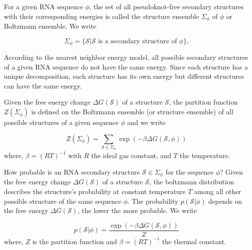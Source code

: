 \begin{mydef}
	\label{def:structure_ensemble}
	For a given \ac{RNA} sequence $\phi$,  the set of all pseudoknot-free secondary structures with their corresponding energies is called the structure ensemble $\Sigma_{\phi}$ of $\phi$ or Boltzmann ensemble.  We write
	
	$$
	\Sigma_{\phi} = \{ \mathcal{S} | \mathcal{S} \text{ is a secondary structure of $\phi$}\}.
	$$
	
	According to the nearest neighbor energy model, all possible secondary structures of a given \ac{RNA} sequence do not have the same energy. Since each structure has a unique decomposition, each structure has its own energy but different structures can have the same energy.
\end{mydef}
\begin{mydef}
	\label{def:partition_function}
	
	Given the free energy change $\Delta G(\mathcal{S})$ of a structure $\mathcal{S}$, the partition function $Z(\Sigma_{\phi})$ is defined on the Boltzmann ensemble (or structure ensemble) of all possible structures of a given sequence $\phi$ and we write 
	
	\begin{equation}
	Z(\Sigma_{\phi}) = \sum_{\mathcal{S} \in \Sigma_{\phi} }{\exp(-\beta \Delta G(\mathcal{S}, \phi))}
	\end{equation}
	where, $\beta = (RT)^{-1}$ with $R$ the ideal gas constant, and $T$ the temperature.
	
\end{mydef}
\begin{mydef}
	\label{def:structure_probability}
	How probable is an \ac{RNA} secondary structure $\mathcal{S} \in \Sigma_{\phi}$ for the sequence $\phi$? Given the free energy change $\Delta G(\mathcal{S})$ of a structure $\mathcal{S}$, the boltzmann distribution describes the structure's probability at constant temperature $T$ among all other possible structure of the same sequence $\phi$.
	The probability $p(\mathcal{S}| \phi)$ depends on the free energy $\Delta G(\mathcal{S})$, the lower the more probable. We write
	
	\begin{equation}
	p(\mathcal{S}| \phi)= \frac{\exp(-\beta \Delta G(\mathcal{S}, \phi))}{Z}
	\end{equation}
	where, $Z$ is the partition function and $\beta = (RT)^{-1}$ the thermal constant. 
	
\end{mydef}

